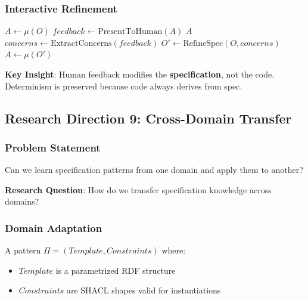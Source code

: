 \subsubsection{Interactive Refinement}

\begin{algorithm}
\caption{Interactive Generation Loop}
\begin{algorithmic}[1]
    \State $A \gets \mu(O)$
        \State $feedback \gets \text{PresentToHuman}(A)$
            \State \Return $A$
            \State $concerns \gets \text{ExtractConcerns}(feedback)$
            \State $O' \gets \text{RefineSpec}(O, concerns)$
            \State $A \gets \mu(O')$
        \EndIf
    \EndWhile
\EndProcedure
\end{algorithmic}
\end{algorithm}

\textbf{Key Insight}: Human feedback modifies the \textbf{specification}, not the code. Determinism is preserved because code always derives from spec.

\subsection{Research Direction 9: Cross-Domain Transfer}

\subsubsection{Problem Statement}

Can we learn specification patterns from one domain and apply them to another?

\textbf{Research Question}: How do we transfer specification knowledge across domains?

\subsubsection{Domain Adaptation}

\begin{definition}
    A pattern $\Pi = (Template, Constraints)$ where:
    \begin{itemize}
        \item $Template$ is a parametrized RDF structure
        \item $Constraints$ are SHACL shapes valid for instantiations
    \end{itemize}
\end{definition}

